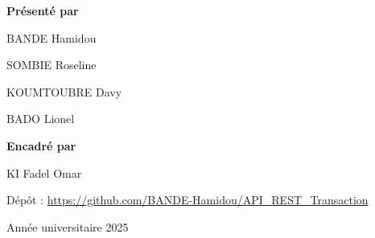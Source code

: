 \begin{titlepage}
\begin{center}
\begin{minipage}[t]{0.5\textwidth}
\centering
{\sansfont\bfseries Présenté par\par}
\vspace{0.3cm}
{\sansfont BANDE Hamidou\par}
{\sansfont SOMBIE Roseline\par}
{\sansfont KOUMTOUBRE Davy\par}
{\sansfont BADO Lionel\par}
\end{minipage}%
\hfill
\begin{minipage}[t]{0.45\textwidth}
\centering
{\sansfont\bfseries Encadré par\par}
\vspace{0.3cm}
{\sansfont KI Fadel Omar\par}
\end{minipage}

\vspace{1cm}
{\sansfont\small Dépôt : \url{https://github.com/BANDE-Hamidou/API_REST_Transaction}\par}

\vfill
{\sansfont Année universitaire 2025\par}
\vspace{0.4cm}
\end{center}
\end{titlepage}
